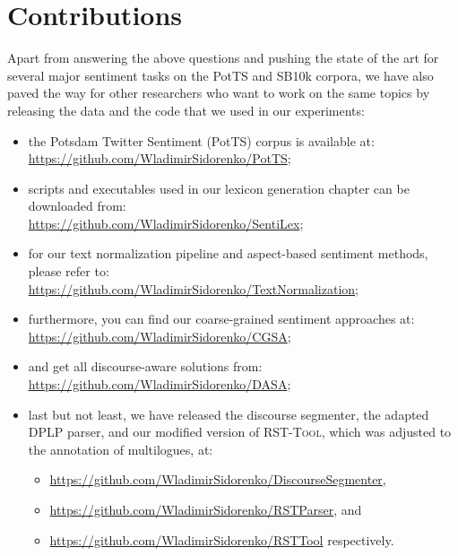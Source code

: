 \section*{Contributions}

Apart from answering the above questions and pushing the state of the
art for several major sentiment tasks on the PotTS and SB10k corpora,
we have also paved the way for other researchers who want to work on
the same topics by releasing the data and the code that we used in our
experiments:
\begin{itemize}
\item the Potsdam Twitter Sentiment (PotTS) corpus is available at:\\
  \url{https://github.com/WladimirSidorenko/PotTS};
\item scripts and executables used in our lexicon generation chapter
  can be downloaded
  from:\\ \url{https://github.com/WladimirSidorenko/SentiLex};
\item for our text normalization pipeline and aspect-based sentiment
  methods, please refer to:\\
  \url{https://github.com/WladimirSidorenko/TextNormalization};
\item furthermore, you can find our coarse-grained sentiment
  approaches at:\\ \url{https://github.com/WladimirSidorenko/CGSA};
\item and get all discourse-aware solutions
  from:\\ \url{https://github.com/WladimirSidorenko/DASA};
\item last but not least, we have released the discourse segmenter,
  the adapted DPLP parser, and our modified version of
  \textsc{RST-Tool}, which was adjusted to the annotation of
  multilogues, at:
  \begin{itemize}
  \item\url{https://github.com/WladimirSidorenko/DiscourseSegmenter},
  \item\url{https://github.com/WladimirSidorenko/RSTParser}, and
  \item\url{https://github.com/WladimirSidorenko/RSTTool} respectively.
  \end{itemize}
\end{itemize}

